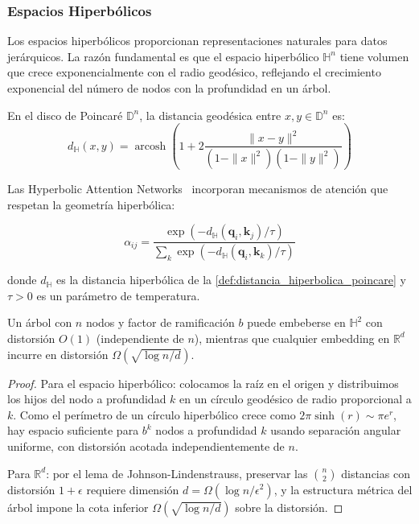 \subsubsection{Espacios Hiperbólicos}

Los espacios hiperbólicos proporcionan representaciones naturales para datos jerárquicos. La razón fundamental es que el espacio hiperbólico $\mathbb{H}^n$ tiene volumen que crece exponencialmente con el radio geodésico, reflejando el crecimiento exponencial del número de nodos con la profundidad en un árbol.

\begin{definition}\label{def:distancia_hiperbolica_poincare}
En el disco de Poincaré $\mathbb{D}^n$, la distancia geodésica entre $x, y \in \mathbb{D}^n$ es:
\begin{equation}
d_{\mathbb{H}}(x, y) = \operatorname{arcosh}\left(1 + 2\frac{\|x - y\|^2}{(1 - \|x\|^2)(1 - \|y\|^2)}\right)
\end{equation}
\end{definition}

Las Hyperbolic Attention Networks~\citep{gulcehre2019hyperbolic} incorporan mecanismos de atención que respetan la geometría hiperbólica:

\begin{equation}
\alpha_{ij} = \frac{\exp(-d_{\mathbb{H}}(\mathbf{q}_i, \mathbf{k}_j)/\tau)}{\sum_{k} \exp(-d_{\mathbb{H}}(\mathbf{q}_i, \mathbf{k}_k)/\tau)}
\end{equation}

donde $d_{\mathbb{H}}$ es la distancia hiperbólica de la \autoref{def:distancia_hiperbolica_poincare} y $\tau > 0$ es un parámetro de temperatura.

\begin{proposition}\label{prop:capacidad_hiperbolica}
Un árbol con $n$ nodos y factor de ramificación $b$ puede embeberse en $\mathbb{H}^2$ con distorsión $O(1)$ (independiente de $n$), mientras que cualquier embedding en $\mathbb{R}^d$ incurre en distorsión $\Omega(\sqrt{\log n / d})$.
\end{proposition}

\begin{proof}
Para el espacio hiperbólico: colocamos la raíz en el origen y distribuimos los hijos del nodo a profundidad $k$ en un círculo geodésico de radio proporcional a $k$. Como el perímetro de un círculo hiperbólico crece como $2\pi \sinh(r) \sim \pi e^r$, hay espacio suficiente para $b^k$ nodos a profundidad $k$ usando separación angular uniforme, con distorsión acotada independientemente de $n$.

Para $\mathbb{R}^d$: por el lema de Johnson-Lindenstrauss, preservar las $\binom{n}{2}$ distancias con distorsión $1 + \epsilon$ requiere dimensión $d = \Omega(\log n / \epsilon^2)$, y la estructura métrica del árbol impone la cota inferior $\Omega(\sqrt{\log n / d})$ sobre la distorsión.
\end{proof}

